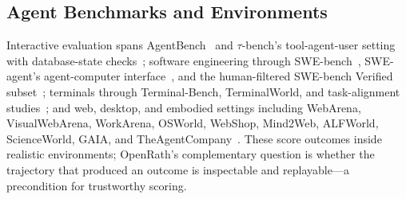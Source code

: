 \subsection{Agent Benchmarks and Environments}

Interactive evaluation spans AgentBench~\cite{agentbench} and $\tau$-bench's
tool-agent-user setting with database-state checks~\cite{taubench}; software
engineering through SWE-bench~\cite{swebench}, SWE-agent's agent-computer
interface~\cite{swe-agent}, and the human-filtered SWE-bench Verified
subset~\cite{swebench-verified}; terminals through Terminal-Bench, TerminalWorld,
and task-alignment studies~\cite{terminal-bench,terminalworld,tab-benchmark}; and
web, desktop, and embodied settings including WebArena, VisualWebArena,
WorkArena, OSWorld, WebShop, Mind2Web, ALFWorld, ScienceWorld, GAIA, and
TheAgentCompany~\cite{webarena,visualwebarena,workarena,osworld,webshop,mind2web,alfworld,scienceworld,gaia,theagentcompany}.
These score outcomes inside realistic environments; OpenRath's complementary
question is whether the trajectory that produced an outcome is inspectable and
replayable---a precondition for trustworthy scoring.

